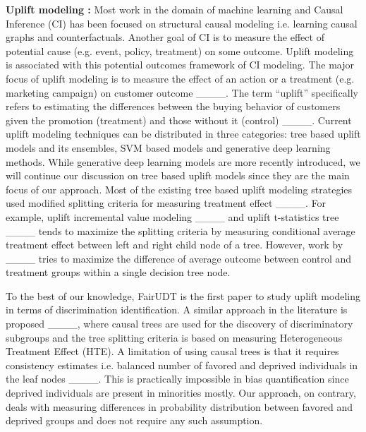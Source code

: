 \textbf{Uplift modeling :} 
Most work in the domain of machine learning and Causal Inference (CI) has been focused on structural causal modeling i.e. learning causal graphs and counterfactuals. Another goal of CI is to measure the effect of potential cause (e.g. event, policy, treatment) on some outcome. Uplift modeling is associated with this potential outcomes framework of CI modeling.
The major focus of uplift modeling is to measure the effect of an action or a treatment (e.g. marketing campaign) on customer outcome ____. The term “uplift” specifically refers to estimating the differences between the buying behavior of customers given the promotion (treatment) and those without it (control) ____. Current uplift modeling techniques can be distributed in three categories: tree based uplift models and its ensembles, SVM based models and generative deep learning methods. While generative deep learning models are more recently introduced, we will continue our discussion on tree based uplift models since they are the main focus of our approach. Most of the existing tree based uplift modeling strategies used modified splitting criteria for measuring treatment effect ____. For example, uplift incremental value modeling ____ and uplift t-statistics tree ____ tends to maximize the splitting criteria by measuring conditional average treatment effect between left and right child node of a tree. However, work by ____ tries to maximize the difference of average outcome between control and treatment groups within a single decision tree node.

To the best of our knowledge, FairUDT is the first paper to study uplift modeling in terms of discrimination identification. A similar approach in the literature is proposed ____, where causal trees are used for the discovery of discriminatory subgroups and the tree splitting criteria is based on measuring Heterogeneous Treatment Effect (HTE). A limitation of using causal trees is that it requires consistency estimates i.e. balanced number of favored and deprived individuals in the leaf nodes ____. This is practically impossible in bias quantification since deprived individuals are present in minorities mostly. Our approach, on contrary, deals with measuring differences in probability distribution between favored and deprived groups and does not require any such assumption.

